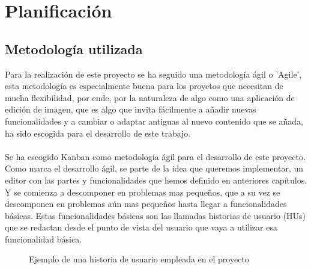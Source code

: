 \chapter{Planificación}

\section{Metodología utilizada}
    Para la realización de este proyecto se ha seguido una metodología ágil o 'Agile', esta metodología
    es especialmente buena para los proyetos que necesitan de mucha flexibilidad, por ende, por 
    la naturaleza de algo como una aplicación de edición de imagen, que es algo que invita fácilmente a 
    añadir nuevas funcionalidades y a cambiar o adaptar antiguas al nuevo contenido que se añada,
    ha sido escogida para el desarrollo de este trabajo.
    \\\\
    Se ha escogido Kanban como metodología ágil para el desarrollo de este proyecto.
    Como marca el desarrollo ágil, se parte de la idea que queremos implementar, un editor
    con las partes y funcionalidades que hemos definido en anteriores capítulos. Y se comienza
    a descomponer en problemas mas pequeños, que a su vez se descomponen en problemas aún mas 
    pequeños hasta llegar a funcionalidades básicas. 
    Estas funcionalidades básicas son las llamadas historias de usuario (HUs) que se redactan 
    desde el punto de vista del usuario que vaya a utilizar esa funcionalidad básica.

    \begin{figure}[!h]
      \centering
      \noindent{}
      \caption{Ejemplo de una historia de usuario empleada en el proyecto}
    \end{figure}
    




